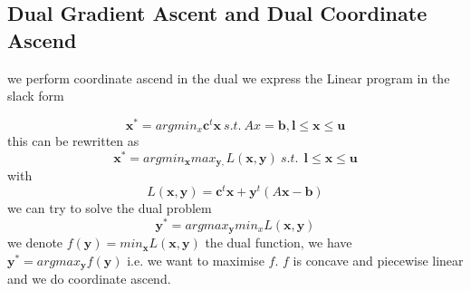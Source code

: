 \documentclass[11pt]{article}
\begin{document}
\subsection{Dual Gradient Ascent and Dual Coordinate Ascend}

we perform coordinate ascend in the dual
we express the Linear program in the slack form

\begin{equation}
\mathbf{x}^*=argmin_x \mathbf{c}^t\mathbf{x} ~  s.t.~  Ax=\mathbf{b}, \mathbf{l}\leq \mathbf{x}\leq \mathbf{u} 
\end{equation}
this can be rewritten as 
\begin{equation}
\mathbf{x}^*=argmin_\mathbf{x} max_{\mathbf{y},}L(\mathbf{x},\mathbf{y})~  s.t.~ ~ \mathbf{l}\leq \mathbf{x}\leq \mathbf{u} 
\end{equation}
with 
\begin{equation}
L(\mathbf{x},\mathbf{y})=\mathbf{c}^t\mathbf{x}+\mathbf{y}^t(A\mathbf{x}-\mathbf{b})
\end{equation}
we can try to solve the dual problem
\begin{equation}
\mathbf{y}^*=argmax_{\mathbf{y}}min_xL(\mathbf{x},\mathbf{y})
\end{equation}
we denote $f(\mathbf{y})=min_{\mathbf x}L(\mathbf{x},\mathbf{y})$ the dual function, we have $\mathbf{y}^*=argmax_{\mathbf{y}}f(\mathbf{y})$ i.e. we want to maximise $f$. $f$ is concave and piecewise linear and we do coordinate ascend.
\end{document}
